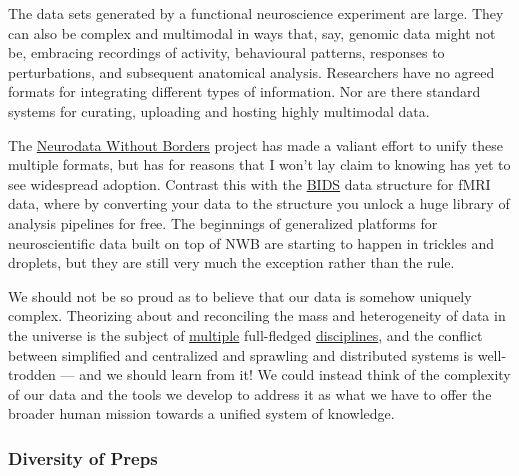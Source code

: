 \documentclass[10pt]{article}
\begin{document}
\begin{multicols}{2}
\begin{leftbar}
The data sets generated by a functional neuroscience experiment are
large. They can also be complex and multimodal in ways that, say,
genomic data might not be, embracing recordings of activity, behavioural
patterns, responses to perturbations, and subsequent anatomical
analysis. Researchers have no agreed formats for integrating different
types of information. Nor are there standard systems for curating,
uploading and hosting highly multimodal data. \cite{mainenBetterWayCrack2016} 
\end{leftbar}

The \href{https://www.nwb.org/}{Neurodata Without Borders} project has
made a valiant effort to unify these multiple formats, but has for
reasons that I won't lay claim to knowing has yet to see widespread
adoption. Contrast this with the
\href{https://bids.neuroimaging.io/}{BIDS} data structure for fMRI data,
where by converting your data to the structure you unlock a huge library
of analysis pipelines for free. The beginnings of generalized platforms
for neuroscientific data built on top of NWB are starting to happen in
trickles and droplets, but they are still very much the exception rather
than the rule.

We should not be so proud as to believe that our data is somehow
uniquely complex. Theorizing about and reconciling the mass and
heterogeneity of data in the universe is the subject of
\href{https://en.wikipedia.org/wiki/Information_science}{multiple}
full-fledged
\href{https://en.wikipedia.org/wiki/Library_science}{disciplines}, and
the conflict between simplified and centralized \cite{bakerMaintainingDublinCore2005}  and sprawling and distributed \cite{berners-leeSEMANTICWEB2001}  systems is well-trodden --- and we
should learn from it! We could instead think of the complexity of our
data and the tools we develop to address it as what we have to offer the
broader human mission towards a unified system of knowledge.

\hypertarget{diversity-of-preps}{%
\subsubsection{Diversity of Preps}\label{diversity-of-preps}}


\end{multicols}
\end{document}
